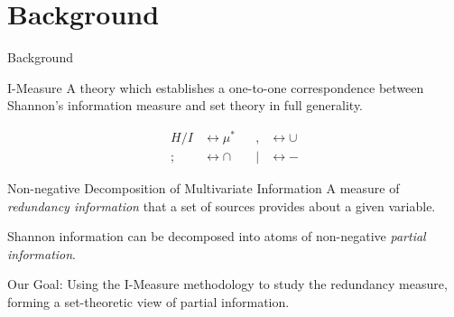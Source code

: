 
\section{Background}

\begin{frame}{Background}%
\begin{block}{I-Measure}
  A theory which establishes a one-to-one correspondence between Shannon's information measure and set theory in full generality.

    \begin{equation}\begin{aligned}
    H / I & \leftrightarrow \mu^{*} &&  , & \leftrightarrow \cup \\
    ; & \leftrightarrow \cap &&    | & \leftrightarrow -
    \end{aligned}\end{equation}
\end{block}

\begin{block}{Non-negative Decomposition of Multivariate Information}
  A measure of \emph{redundancy information} that a set of sources provides about a given variable.
  
  Shannon information can be decomposed into atoms of non-negative \emph{partial information}.
\end{block}


Our Goal: Using the I-Measure methodology to study the redundancy measure, forming a set-theoretic view of partial information.

\end{frame}


